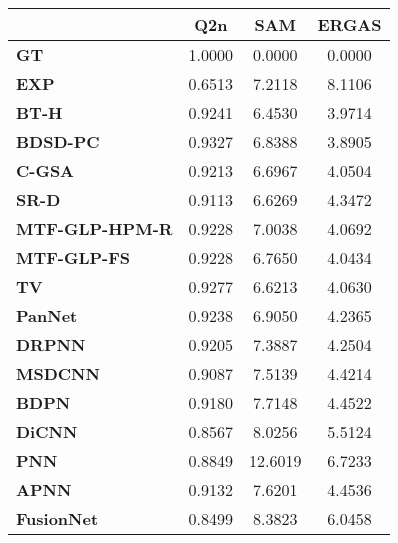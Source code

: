 \begin{tabular}{|l|c|c|c|}
\hline
&\textbf{Q2n}&\textbf{SAM}&\textbf{ERGAS}\\\hline
\textbf{GT}&1.0000&0.0000&0.0000\\\hline
\textbf{EXP}&0.6513&7.2118&8.1106\\\hline
\textbf{BT-H}&0.9241&6.4530&3.9714\\\hline
\textbf{BDSD-PC}&0.9327&6.8388&3.8905\\\hline
\textbf{C-GSA}&0.9213&6.6967&4.0504\\\hline
\textbf{SR-D}&0.9113&6.6269&4.3472\\\hline
\textbf{MTF-GLP-HPM-R}&0.9228&7.0038&4.0692\\\hline
\textbf{MTF-GLP-FS}&0.9228&6.7650&4.0434\\\hline
\textbf{TV}&0.9277&6.6213&4.0630\\\hline
\textbf{PanNet}&0.9238&6.9050&4.2365\\\hline
\textbf{DRPNN}&0.9205&7.3887&4.2504\\\hline
\textbf{MSDCNN}&0.9087&7.5139&4.4214\\\hline
\textbf{BDPN}&0.9180&7.7148&4.4522\\\hline
\textbf{DiCNN}&0.8567&8.0256&5.5124\\\hline
\textbf{PNN}&0.8849&12.6019&6.7233\\\hline
\textbf{APNN}&0.9132&7.6201&4.4536\\\hline
\textbf{FusionNet}&0.8499&8.3823&6.0458\\\hline
\end{tabular}
